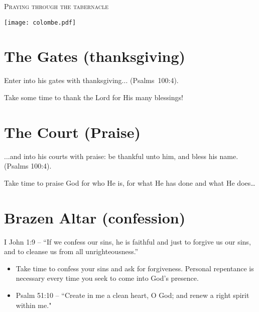 \begin{center}
\mbox{}

\bigskip

\LARGE\textsc{Praying through the tabernacle}

\vspace{2ex plus \fill}

\large{}

\vspace{3ex plus \fill}

\texttt{[image: colombe.pdf]}

\vspace{0ex plus \fill}


\mbox{}
\end{center}

\pagestyle{empty}
\setlength{\parindent}{0em}

\section{The Gates (thanksgiving)}

Enter into his gates with thanksgiving... (Psalms~100:4).

Take some time to thank the Lord for His many blessings!


\section{The Court (Praise)}

...and into his courts with praise: be thankful unto him, and bless his name. (Psalms 100:4).

Take time to praise God for who He is, for what He has done and what He does\dots{} 



\section{Brazen Altar (confession)}

I John 1:9 – “If we confess our sins, he is faithful and just to forgive us our sins, and to cleanse us from all unrighteousness.”

\begin{itemize}
\item Take time to confess your sins and ask for forgiveness. Personal repentance is necessary every time you seek to come into God’s presence.
\item Psalm 51:10 – “Create in me a clean heart, O God; and renew a right spirit within me."
\end{itemize}


